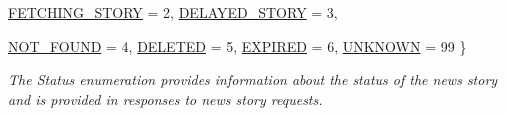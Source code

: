 \begin{CompactItemize}
\hyperlink{classWombat_1_1MamdaNewsStory_25ee81ce6b01be03a95ab954acdb1e6d866afc6753bbe803ee90064f27b16029}{FETCHING\_\-STORY} =  2, 
\hyperlink{classWombat_1_1MamdaNewsStory_25ee81ce6b01be03a95ab954acdb1e6dc9b90512cf65ec3da1f1c94d1c8cc916}{DELAYED\_\-STORY} =  3, 
\par
\hyperlink{classWombat_1_1MamdaNewsStory_25ee81ce6b01be03a95ab954acdb1e6da7c45aed8f450f8f214fa6a21bd2bdad}{NOT\_\-FOUND} =  4, 
\hyperlink{classWombat_1_1MamdaNewsStory_25ee81ce6b01be03a95ab954acdb1e6d9a01a0950bd67668292e7fa1ec44e3f5}{DELETED} =  5, 
\hyperlink{classWombat_1_1MamdaNewsStory_25ee81ce6b01be03a95ab954acdb1e6d59c70f42395b766ed6e1a0bd7d8ffebb}{EXPIRED} =  6, 
\hyperlink{classWombat_1_1MamdaNewsStory_25ee81ce6b01be03a95ab954acdb1e6d43dd597758083814fe1acd2e024898d8}{UNKNOWN} =  99
 \}
\begin{CompactList}\small\item\em The Status enumeration provides information about the status of the news story and is provided in responses to news story requests. \item\end{CompactList}\end{CompactItemize}
